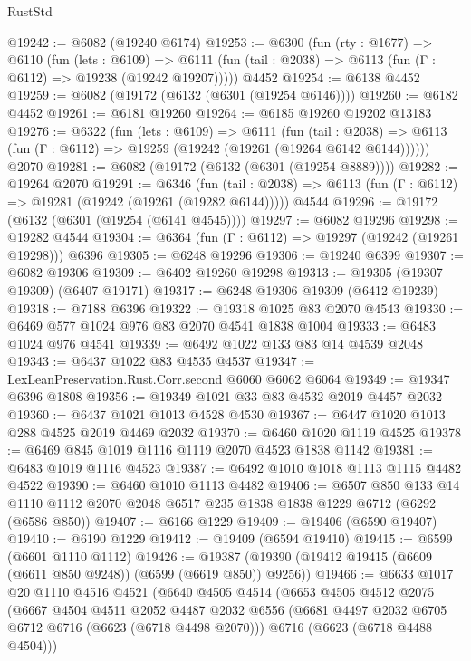 \begin{lexlean}{RustStd}
\begin{coremodule}
@19242 := @6082 (@19240 @6174)
@19253 := @6300
    (fun (rty : @1677) =>
    @6110
      (fun (lets : @6109) =>
      @6111 (fun (tail : @2038) => @6113 (fun (Γ : @6112) => @19238 (@19242 @19207)))))
    @4452
@19254 := @6138 @4452
@19259 := @6082 (@19172 (@6132 (@6301 (@19254 @6146))))
@19260 := @6182 @4452
@19261 := @6181 @19260
@19264 := @6185 @19260 @19202 @13183
@19276 := @6322
    (fun (lets : @6109) =>
    @6111
      (fun (tail : @2038) =>
      @6113 (fun (Γ : @6112) => @19259 (@19242 (@19261 (@19264 @6142 @6144))))))
    @2070
@19281 := @6082 (@19172 (@6132 (@6301 (@19254 @8889))))
@19282 := @19264 @2070
@19291 := @6346
    (fun (tail : @2038) => @6113 (fun (Γ : @6112) => @19281 (@19242 (@19261 (@19282 @6144)))))
    @4544
@19296 := @19172 (@6132 (@6301 (@19254 (@6141 @4545))))
@19297 := @6082 @19296
@19298 := @19282 @4544
@19304 := @6364 (fun (Γ : @6112) => @19297 (@19242 (@19261 @19298))) @6396
@19305 := @6248 @19296
@19306 := @19240 @6399
@19307 := @6082 @19306
@19309 := @6402 @19260 @19298
@19313 := @19305 (@19307 @19309) (@6407 @19171)
@19317 := @6248 @19306 @19309 (@6412 @19239)
@19318 := @7188 @6396
@19322 := @19318 @1025 @83 @2070 @4543
@19330 := @6469 @577 @1024 @976 @83 @2070 @4541 @1838 @1004
@19333 := @6483 @1024 @976 @4541
@19339 := @6492 @1022 @133 @83 @14 @4539 @2048
@19343 := @6437 @1022 @83 @4535 @4537
@19347 := LexLeanPreservation.Rust.Corr.second @6060 @6062 @6064
@19349 := @19347 @6396 @1808
@19356 := @19349 @1021 @33 @83 @4532 @2019 @4457 @2032
@19360 := @6437 @1021 @1013 @4528 @4530
@19367 := @6447 @1020 @1013 @288 @4525 @2019 @4469 @2032
@19370 := @6460 @1020 @1119 @4525
@19378 := @6469 @845 @1019 @1116 @1119 @2070 @4523 @1838 @1142
@19381 := @6483 @1019 @1116 @4523
@19387 := @6492 @1010 @1018 @1113 @1115 @4482 @4522
@19390 := @6460 @1010 @1113 @4482
@19406 := @6507
    @850
    @133
    @14
    @1110
    @1112
    @2070
    @2048
    @6517
    @235
    @1838
    @1838
    @1229
    @6712
    (@6292 (@6586 @850))
@19407 := @6166 @1229
@19409 := @19406 (@6590 @19407)
@19410 := @6190 @1229
@19412 := @19409 (@6594 @19410)
@19415 := @6599 (@6601 @1110 @1112)
@19426 := @19387 (@19390 (@19412 @19415 (@6609 (@6611 @850 @9248)) (@6599 (@6619 @850)) @9256))
@19466 := @6633
    @1017
    @20
    @1110
    @4516
    @4521
    (@6640
      @4505
      @4514
      (@6653
        @4505
        @4512
        @2075
        (@6667
          @4504
          @4511
          @2052
          @4487
          @2032
          @6556
          (@6681 @4497 @2032 @6705 @6712 @6716 (@6623 (@6718 @4498 @2070)))
          @6716
          (@6623 (@6718 @4488 @4504)))

\end{coremodule}
\end{lexlean}
